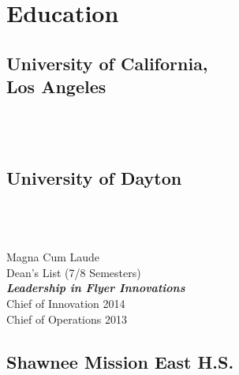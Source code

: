 \documentclass[letterpaper]{deedy-resume} %
\begin{document}
\begin{minipage}[t]{0.32\textwidth} %


\section{Education} 

\subsection[UCLA]{University of California,\\ Los Angeles}

 \\
 \\

\sectionspace %


\subsection{University of Dayton}
 \\
 \\
 \\
Magna Cum Laude\\
Dean's List (7/8 Semesters) \\
{\footnotesize \textit{\textbf{Leadership in Flyer Innovations}}} \\
Chief of Innovation \hfill 2014\\
Chief of Operations \hfill 2013\\


\sectionspace %


\subsection{Shawnee Mission East H.S.}

 \\


\end{minipage}
\end{document}
